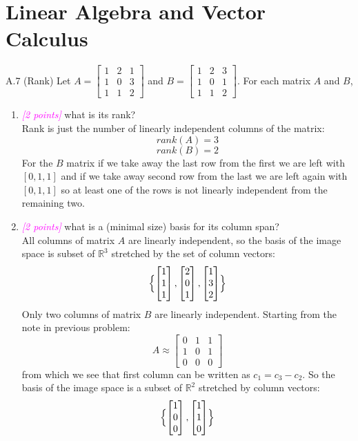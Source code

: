 \documentclass{article}
\newcommand{\1}{\mathbf{1}}
\newcommand{\points}[1]{\small\textcolor{magenta}{\emph{[#1 points]}} \normalsize}
\begin{document}
\section*{Linear Algebra and Vector Calculus}
A.7 (Rank) Let $A = \begin{bmatrix} 1 & 2 & 1 \\ 1 & 0 & 3 \\ 1 & 1 & 2 \end{bmatrix}$ and $B = \begin{bmatrix} 1 & 2 & 3 \\ 1 & 0 & 1 \\ 1 & 1 & 2 \end{bmatrix}$.
For each matrix $A$ and $B$,
\begin{enumerate} 
	\item \points{2} what is its rank?  \\
	Rank is just the number of linearly independent columns of the matrix:
	$$rank(A) = 3$$
	$$rank(B) = 2$$
	For the $B$ matrix if we take away the last row from the first we are left with $[0,1, 1]$ and if we take away second row from the last we are left again with $[0, 1, 1]$ so at least one of the rows is not linearly independent from the remaining two. 
	\item \points{2} what is a (minimal size) basis for its column span? \\
	All columns of matrix $A$ are linearly independent, so the basis of the image space is subset of $\mathbb R^3$ stretched by the set of column vectors: 
	$$\Bigl\{   \begin{bmatrix} 1 \\ 1 \\ 1\end{bmatrix}, \begin{bmatrix} 2 \\ 0 \\ 1\end{bmatrix}, \begin{bmatrix} 1 \\ 3 \\ 2\end{bmatrix}    \Bigr\}$$
	Only two columns of matrix $B$ are linearly independent. Starting from the note in previous problem:
	 $$A \approx \begin{bmatrix} 0 & 1 & 1 \\ 1 & 0 & 1 \\ 0 & 0 & 0 \end{bmatrix}$$
	from which we see that first column can be written as $c_1=c_3-c_2$. So the basis of the image space is a subset of $\mathbb R^2$ stretched by column vectors:
	$$\Bigl\{   \begin{bmatrix} 1 \\ 0 \\ 0\end{bmatrix}, \begin{bmatrix} 1 \\ 1 \\ 0\end{bmatrix}  \Bigr\}$$
\end{enumerate}
\end{document}

